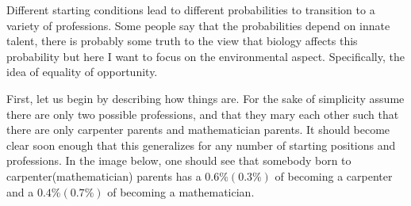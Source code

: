 \documentclass{report}
\begin{document}

Different starting conditions lead to different probabilities to transition to a variety of professions. Some people say that the probabilities depend on innate talent, there is probably some truth to the view that biology affects this probability but here I want to focus on the environmental aspect. Specifically, the idea of equality of opportunity.

First, let us begin by describing how things are. For the sake of simplicity assume there are only two possible professions, and that they mary each other such that there are only carpenter parents and mathematician parents. It should become clear soon enough that this generalizes for any number of starting positions and professions. In the image below, one should see that somebody born to carpenter(mathematician) parents has a $0.6\%(0.3\%)$ of becoming a carpenter and a $0.4\%(0.7\%)$ of becoming a mathematician. 
\end{document}
